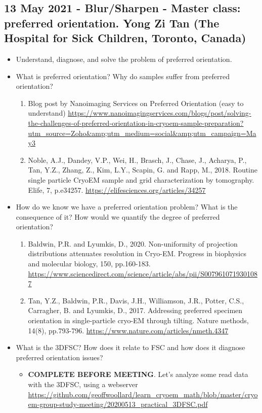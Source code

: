 \documentclass[11pt, oneside]{article}   	%
\begin{document}
\subsection{13 May 2021 - Blur/Sharpen - Master class: preferred orientation. Yong Zi Tan (The Hospital for Sick Children, Toronto, Canada)}

\begin{itemize}
	\item Understand, diagnose, and solve the problem of preferred orientation.
\end{itemize}
\begin{itemize}
	\item What is preferred orientation? Why do samples suffer from preferred orientation?
\begin{enumerate}
\item Blog post by Nanoimaging Services on Preferred Orientation (easy to understand) {\tiny\url{https://www.nanoimagingservices.com/blogs/post/solving-the-challenges-of-preferred-orientation-in-cryoem-sample-preparation?utm_source=Zoho&amp;utm_medium=social&amp;utm_campaign=May3}}
	\item Noble, A.J., Dandey, V.P., Wei, H., Brasch, J., Chase, J., Acharya, P., Tan, Y.Z., Zhang, Z., Kim, L.Y.,
Scapin, G. and Rapp, M., 2018. Routine single particle CryoEM sample and grid characterization by
tomography. Elife, 7, p.e34257. \url{https://elifesciences.org/articles/34257}
\end{enumerate}
\end{itemize}
\begin{itemize}
	\item How do we know we have a preferred orientation problem? What is the consequence of it? How would we quantify the degree of preferred orientation?
	\begin{enumerate}
		\item Baldwin, P.R. and Lyumkis, D., 2020. Non-uniformity of projection distributions attenuates resolution
in Cryo-EM. Progress in biophysics and molecular biology, 150, pp.160-183. \url{https://www.sciencedirect.com/science/article/abs/pii/S0079610719301087}
		\item Tan, Y.Z., Baldwin, P.R., Davis, J.H., Williamson, J.R., Potter, C.S., Carragher, B. and Lyumkis, D., 2017.
Addressing preferred specimen orientation in single-particle cryo-EM through tilting. Nature
methods, 14(8), pp.793-796. \url{https://www.nature.com/articles/nmeth.4347}
	\end{enumerate}
	\item What is the 3DFSC? How does it relate to FSC and how does it diagnose preferred
orientation issues?
	\begin{itemize}
	\item {\bf COMPLETE BEFORE MEETING}. Let's analyze some read data with the 3DFSC, using a webserver \url{https://github.com/geoffwoollard/learn_cryoem_math/blob/master/cryoem-group-study-meeting/20200513_practical_3DFSC.pdf}
	\end{itemize}
\end{itemize}
\end{document}
